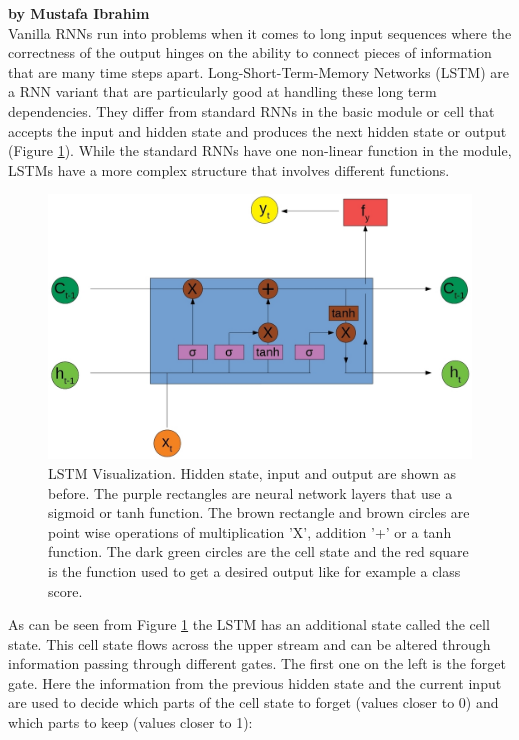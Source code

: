 \documentclass{article}
\begin{document}
\textbf{by Mustafa Ibrahim} \\

Vanilla RNNs run into problems when it comes to long input sequences where the correctness of the output hinges on the ability to connect pieces of information that are many time steps apart. Long-Short-Term-Memory Networks (LSTM) are a RNN variant that are particularly good at handling these long term dependencies. They differ from standard RNNs in the basic module or cell that accepts the input and hidden state and produces the next hidden state or output (Figure \ref{fig:LSTM}). While the standard RNNs have one non-linear function in the module, LSTMs have a more complex structure that involves different functions\cite{Olah}.
\begin{figure}[H]
\begin{center}
\includegraphics[scale=0.3]{rsz_1lstm}
\end{center}
\caption{LSTM Visualization. Hidden state, input and output are shown as before. The purple rectangles are neural network layers that use a sigmoid or tanh function. The brown rectangle and brown circles are point wise operations of multiplication 'X', addition '+' or a tanh function. The dark green circles are the cell state and the red square is the function used to get a desired output like for example a class score.}
\label{fig:LSTM}
\end{figure}  
As can be seen from Figure \ref{fig:LSTM} the LSTM has an additional state called the cell state. This cell state flows across the upper stream and can be altered through information passing through different gates. The first one on the left is the forget gate. Here the information from the previous hidden state and the current input are used to decide which parts of the cell state to forget (values closer to 0) and which parts to keep (values closer to 1):
\end{document}
